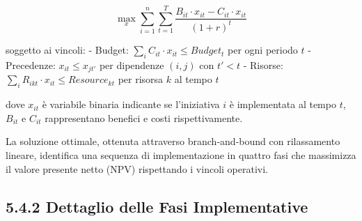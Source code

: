 $$\max_{x} \sum_{i=1}^{n} \sum_{t=1}^{T} \frac{B_{it} \cdot x_{it} - C_{it} \cdot x_{it}}{(1+r)^t}$$

soggetto ai vincoli:
- Budget: $\sum_{i} C_{it} \cdot x_{it} \leq Budget_t$ per ogni periodo $t$
- Precedenze: $x_{it} \leq x_{jt'}$ per dipendenze $(i,j)$ con $t' < t$
- Risorse: $\sum_{i} R_{ikt} \cdot x_{it} \leq Resource_{kt}$ per risorsa $k$ al tempo $t$

dove $x_{it}$ è variabile binaria indicante se l'iniziativa $i$ è implementata al tempo $t$, $B_{it}$ e $C_{it}$ rappresentano benefici e costi rispettivamente.

La soluzione ottimale, ottenuta attraverso branch-and-bound con rilassamento lineare, identifica una sequenza di implementazione in quattro fasi che massimizza il valore presente netto (NPV) rispettando i vincoli operativi.

\subsection{5.4.2 Dettaglio delle Fasi Implementative}

